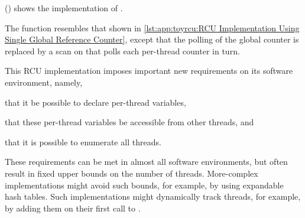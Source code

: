 \QuickQuizEnd

\begin{listing}

\caption{RCU Update Using Per-Thread Reference-Count}
\label{lst:app:toyrcu:RCU Update Using Per-Thread Reference-Count}
\end{listing}

()
shows the implementation of .
\begin{fcvref}
The  function resembles that shown in
\cref{lst:app:toyrcu:RCU Implementation Using Single Global Reference Counter},
except that the polling of the global counter is replaced by a scan on
that polls each per-thread counter in turn.
\end{fcvref}

This RCU implementation imposes important new requirements on its
software environment, namely,
%
\begin{enumerate*}[(1)]
\item {}that it be possible to declare per-thread variables,
\item {}that these per-thread variables be accessible from other threads, and
\item {}that it is possible to enumerate all threads.
\end{enumerate*}
%
These requirements can be met in almost all software environments,
but often result in fixed upper bounds on the number of threads.
More-complex implementations might avoid such bounds, for example, by using
expandable hash tables.
Such implementations might dynamically track threads, for example, by
adding them on their first call to .

